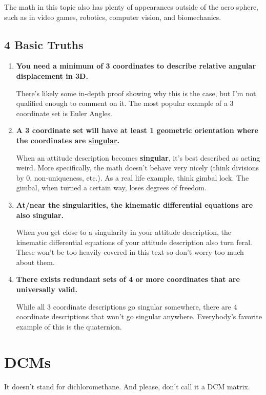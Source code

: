 \documentclass[a4paper,14pt]{extreport}
\begin{document}
The math in this topic also has plenty of appearances outside of the aero sphere, such as in video games, robotics, computer vision, and biomechanics.

\section{4 Basic Truths}
\begin{enumerate}
\item \textbf{You need a minimum of 3 coordinates to describe relative angular displacement in 3D.} 

There's likely some in-depth proof showing why this is the case, but I'm not qualified enough to comment on it. The most popular example of a 3 coordinate set is Euler Angles.

\item \textbf{A 3 coordinate set will have at least 1 geometric orientation where the coordinates are \underline{singular}.} 

When an attitude description becomes \textbf{singular}, it's best described as acting weird. More specifically, the math doesn't behave very nicely (think divisions by 0, non-uniqueness, etc.). As a real life example, think gimbal lock. The gimbal, when turned a certain way, loses degrees of freedom.

\item \textbf{At/near the singularities, the kinematic differential equations are also singular.} 

When you get close to a singularity in your attitude description, the kinematic differential equations of your attitude description also turn feral. These won't be too heavily covered in this text so don't worry too much about them.

\item \textbf{There exists redundant sets of 4 or more coordinates that are universally valid.}

While all 3 coordinate descriptions go singular somewhere, there are 4 coordinate descriptions that won't go singular anywhere. Everybody's favorite example of this is the quaternion.

\end{enumerate}
\chapter{DCMs}

It doesn't stand for dichloromethane. And please, don't call it a DCM matrix.
\end{document}
